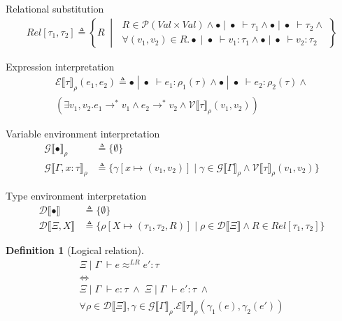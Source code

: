 \documentclass[twoside,11pt,openright]{report}
\theoremstyle{definition}
\newtheorem{definition}{Definition}[section]
\newcommand{\var}{x}
\newcommand{\expr}{e}
\newcommand{\val}{v}
\newcommand{\Tvar}{X}
\newcommand{\typ}{\tau}
\newcommand{\venv}{\Gamma}
\newcommand{\tenv}{\Xi}
\newcommand{\emptenv}{\bullet}
\newcommand{\empvenv}{\bullet}
\newcommand{\jdg}[4]{#1 \; | \; #2 \; \vdash #3 : #4}
\newcommand{\jdgType}[3]{#1 \; | \; #2 \; \vdash #3}
\newcommand{\jdgRel}[6]{#1 \; | \; #2 \; \vdash #3 \approx^{#4} #5 : #6}
\newcommand{\stepS}{\rightarrow^*}
\newcommand{\ValInp}[2]{\mathcal{V} \llbracket #1 \rrbracket_{#2}}
\newcommand{\ValInpGen}[2]{\ValInp{#1}{#2}(\val_1, \val_2)}
\newcommand{\ExpInp}[2]{\mathcal{E} \llbracket #1 \rrbracket_{#2}}
\newcommand{\VenvInp}[2]{\mathcal{G} \llbracket #1 \rrbracket_{#2}}
\newcommand{\TenvInp}[1]{\mathcal{D} \llbracket #1 \rrbracket}
\newcommand{\LogRel}[5]{\jdgRel{#1}{#2}{#3}{LR}{#4}{#5}}
\newcommand{\map}[2]{#1 \mapsto #2}
\begin{document}
Relational substitution
\begin{align*}
  Rel[\typ_1, \typ_2] \triangleq 
  \left\{R \; \middle\vert \;
  \begin{aligned}
    R \in \mathcal{P}(Val \times Val) \land \jdgType{\emptenv}{\empvenv}{\typ_1} \land \jdgType{\emptenv}{\empvenv}{\typ_2} \land\\ \forall (\val_1, \val_2) \in R . \jdg{\emptenv}{\empvenv}{\val_1}{\typ_1} \land \jdg{\emptenv}{\empvenv}{\val_2}{\typ_2}
  \end{aligned}
  \right\}
\end{align*}

Expression interpretation
\begin{multline*}
  \ExpInp{\typ}{\rho}(\expr_1, \expr_2) \triangleq
    \jdg{\emptenv}{\empvenv}{\expr_1}{\rho_1(\typ)} \land \jdg{\emptenv}{\empvenv}{\expr_2}{\rho_2(\typ)} \land\\
    (\exists \val_1, \val_2 . \expr_1 \stepS \val_1 \land \expr_2 \stepS \val_2 \land\ValInpGen{\typ}{\rho})
\end{multline*}

Variable environment interpretation
\begin{align*}
  \VenvInp{\empvenv}{\rho} &\triangleq \{ \emptyset \}\\
  \VenvInp{\venv, \var : \typ}{\rho} &\triangleq \{\gamma[\map{\var}{(\val_1, \val_2)}] \mid \gamma \in \VenvInp{\venv}{\rho} \land \ValInpGen{\typ}{\rho}\}
\end{align*}

Type environment interpretation
\begin{align*}
  \TenvInp{\emptenv} &\triangleq \{ \emptyset \}\\
  \TenvInp{\tenv, \Tvar} &\triangleq \{\rho[\map{\Tvar}{(\typ_1, \typ_2, R)}] \mid \rho \in \TenvInp{\tenv} \land R \in Rel[\typ_1, \typ_2]\}
\end{align*}

\begin{definition}[Logical relation]\label{def:LogRel}
  \begin{equation*}
    \begin{gathered}
      \LogRel{\tenv}{\venv}{\expr}{\expr'}{\typ}\\
      \iff\\
      \jdg{\tenv}{\venv}{\expr}{\typ} \; \land \; \jdg{\tenv}{\venv}{\expr'}{\typ} \; \land\\
      \forall \rho \in \TenvInp{\tenv}, \gamma \in \VenvInp{\venv}{\rho} . 
      \ExpInp{\typ}{\rho}(\gamma_1(\expr), \gamma_2(\expr'))
    \end{gathered}
  \end{equation*}
\end{definition}
\end{document}
